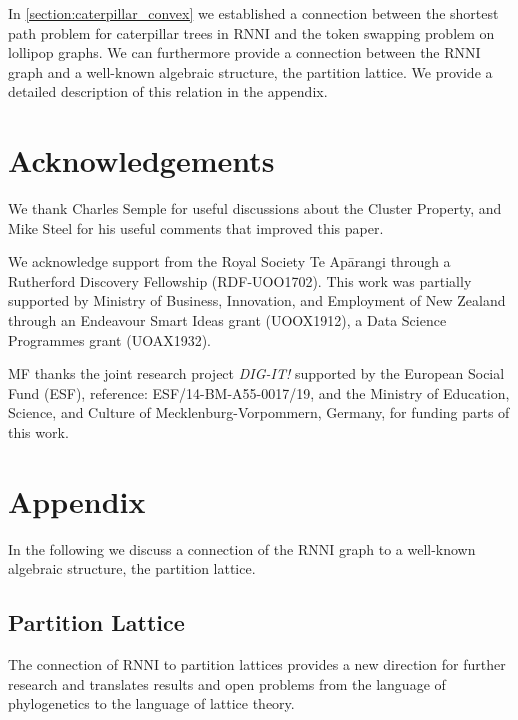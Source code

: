 \documentclass[11pt]{amsart}
\newcommand{\rnni}{\mathrm{RNNI}}
\newcommand{\summary}[1]{} %
\begin{document}
\summary{partition lattice -- can be found in appendix}
In \autoref{section:caterpillar_convex} we established a connection between the shortest path problem for caterpillar trees in $\rnni$ and the token swapping problem on lollipop graphs.
We can furthermore provide a connection between the $\rnni$ graph and a well-known algebraic structure, the partition lattice.
We provide a detailed description of this relation in the appendix.


\section*{Acknowledgements}
We thank Charles Semple for useful discussions about the Cluster Property, and Mike Steel for his useful comments that improved this paper.

We acknowledge support from the Royal Society Te Ap\=arangi through a Rutherford Discovery Fellowship (RDF-UOO1702).
This work was partially supported by Ministry of Business, Innovation, and Employment of New Zealand through an Endeavour Smart Ideas grant (UOOX1912), a Data Science Programmes grant (UOAX1932).

MF thanks the joint research project \textit{DIG-IT!} supported by the European Social Fund (ESF), reference: ESF/14-BM-A55-0017/19, and the Ministry of Education, Science, and Culture of Mecklenburg-Vorpommern, Germany, for funding parts of this work.


\printbibliography


\section{Appendix}

In the following we discuss a connection of the $\rnni$ graph to a well-known algebraic structure, the partition lattice.

\subsection{Partition Lattice}
The connection of $\rnni$ to partition lattices provides a new direction for further research and translates results and open problems from the language of phylogenetics to the language of lattice theory.
\end{document}
